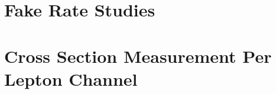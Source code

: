 \documentclass{cmspaper}
\begin{document}

\clearpage
\appendix
\appendixpage
  \section{Fake Rate Studies}
     \label{app:fake_rate_studies}
     
     

\clearpage
\section{Cross Section Measurement Per Lepton Channel}
\label{sec:xsec_per_channel}


%  
\end{document}
